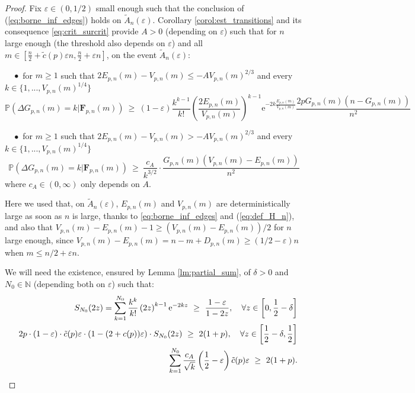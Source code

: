 \documentclass[a4, 11pt]{article}
\numberwithin{equation}{section}
\theoremstyle{plain}
\theoremstyle{definition}
\theoremstyle{remark}
\begin{document}
\begin{proof}
Fix $\varepsilon \in (0,1/2)$ small enough such that the conclusion of (\ref{eq:borne_inf_edges}) holds on $\tilde{A}_n(\varepsilon)$.
	Corollary \ref{corol:est_transitions} and its consequence \eqref{eq:crit_surcrit} provide $A>0$ (depending on $\varepsilon$) such that for $n$ large enough (the threshold also depends on $\varepsilon$) and all $m\in \left[\frac{n}{2}+\tilde{c}(p)\varepsilon n, \frac{n}{2}+\varepsilon n  \right]$, on the event $\tilde{A}_n(\varepsilon)$:
	
	$\quad \bullet$	for $m\geq 1$  such that $2E_{p,n}(m)-V_{p,n}(m)\leq -AV_{p,n}(m)^{2/3}$ and every $k \in \{1,...,V_{p,n}(m)^{1/4}\} $ 
		\begin{equation}
			\mathbb{P}\left(\Delta G_{p,n}(m)=k\vert \mathbf{F}_{p,n}(m)\right)~\geq~(1-\varepsilon) \frac{k^{k-1}}{k!}\left(\frac{2E_{p,n}(m)}{V_{p,n}(m)}\right)^{k-1}\mathrm{e}^{-2k\frac{E_{p,n}(m)}{V_{p,n}(m)}}\frac{2pG_{p,n}(m)(n-G_{p,n}(m))}{n^2} \label{eq:min_probcdtion}
		\end{equation}
		
	$\quad \bullet$ for $m\geq 1$ such that $2E_{p,n}(m)-V_{p,n}(m)>-AV_{p,n}(m)^{2/3}$ and every $k \in \{1,...,V_{p,n}(m)^{1/4} \}$
		\begin{equation}\label{eq:min_prob_cdti_crit+}
			\mathbb{P}\left(\Delta G_{p,n}(m)=k\vert \mathbf{F}_{p,n}(m)\right)~\geq~\frac{c_A} {k^{3/2}} \cdot \frac{G_{p,n}(m)\left(V_{p,n}(m)-E_{p,n}(m)\right)}{n^2}
		\end{equation}
		where $c_A \in (0,\infty)$ only depends on $A$.

	Here we used that, on $\tilde{A}_n(\varepsilon)$, $E_{p,n}(m)$ and $V_{p,n}(m)$ are deterministically large as soon as $n$ is large, thanks to \eqref{eq:borne_inf_edges} and (\ref{eq:def_H_n}), and also that $V_{p,n}(m)-E_{p,n}(m)-1\geq (V_{p,n}(m)-E_{p,n}(m))/2$ for $n$ large enough, since $V_{p,n}(m)-E_{p,n}(m)=n-m+D_{p,n}(m)\geq (1/2-\varepsilon) n$ when $m \leq n/2+\varepsilon n$. 
	
We will need the existence, ensured by Lemma \ref{lm:partial_sum}, of $\delta>0$ and $N_0 \in \mathbb N$ (depending both on $\varepsilon$) such that: 
\begin{eqnarray}
	&& S_{N_0}(2z)=\sum_{k= 1}^{N_0}\frac{k^k}{k!}\left(2z\right)^{k-1}\mathrm{e}^{-2kz}~\geq~\frac{1-\varepsilon}{1-2z}, \quad \forall z\in \left[0,\frac{1}{2}-\delta\right] \label{eq:min_{F}_{p,n}_1}\\
	&&	2p\cdot (1-\varepsilon)\cdot \tilde{c}(p)\varepsilon \cdot (1-(2+c(p))\varepsilon)\cdot S_{N_0}(2z)~\geq~2(1+p), \quad \forall z\in \left[\frac{1}{2}-\delta,\frac{1}{2}\right] \label{eq:min_{F}_{p,n}_2}\\
	&&	\sum_{k=1}^{N_0}\frac{c_A}{\sqrt{k}} \left(\frac{1}{2}-\varepsilon\right)\tilde{c}(p)\varepsilon~\geq~2(1+p). \label{eq:min_E_crit_sucrit}
\end{eqnarray}
	

\end{proof}
\end{document}
